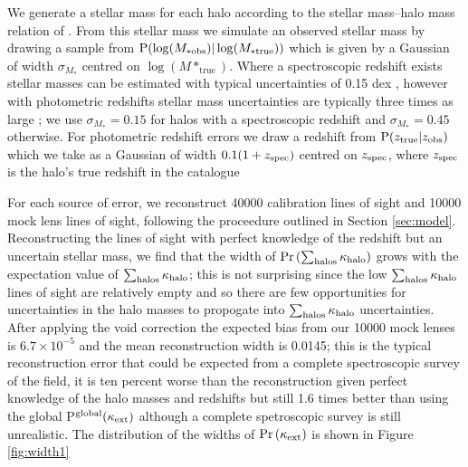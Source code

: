 \documentclass[useAMS,usenatbib]{mn2e}
\begin{document}
We generate a stellar mass for each halo according to the stellar mass--halo mass relation of \citet{behroozi2010}. From this stellar mass we simulate 
an observed stellar mass by drawing a sample from ${\rm P}(\log(M_{* \mathrm {obs}})|\log(M_{* \mathrm {true}}))$ which is given by  a Gaussian of width $\sigma_{M_*}$ centred on $\log(M*_{\mathrm {true}})$. Where a spectroscopic redshift exists stellar masses can be estimated with typical uncertainties of 0.15 dex \citep{xxx}, however with photometric redshifts stellar mass uncertainties are typically three times as large \citep{xxx}; we use $\sigma_{M_*}=0.15$ for halos with a spectroscopic redshift and $\sigma_{M_*}=0.45$ otherwise.  For photometric redshift errors we draw a redshift from ${\rm P}(z_{\rm true}|z_{\rm obs})$ which we take as a Gaussian of width $0.1(1+z_{\rm spec})$ centred on $z_{\rm spec}$, where $z_{\rm spec}$ is the halo's true redshift in the \MS catalogue

For each  source of error, we reconstruct 40000 calibration lines of sight and 10000 mock lens lines of sight, following the proceedure outlined in Section \ref{sec:model}. Reconstructing the lines of sight with perfect knowledge of the redshift but an uncertain stellar mass, we find that the width of $\Pr\left(\sum_{\rm halos} \kappa_{\rm halo} \right)$ grows with the expectation value of $\sum_{\rm halos} \kappa_{\rm halo}$; this is not surprising since the low $\sum_{\rm halos} \kappa_{\rm halo}$ lines of sight are relatively empty and so there are few opportunities for uncertainties in the halo masses to propogate into $\sum_{\rm halos} \kappa_{\rm halo}$ uncertainties. After applying the void correction the expected bias from our 10000 mock lenses is $6.7\times 10^{-5}$ and the mean reconstruction width is 0.0145; this is the typical reconstruction error that could be expected from a complete spectroscopic survey of the field, it is ten percent worse than the reconstruction given perfect knowledge of the halo masses and redshifts but still 1.6 times better than using the global P$^{\rm global}(\kappa_{\rm ext})$ although a complete spetroscopic survey is still unrealistic. The distribution of the widths of $\Pr\left(\kappa_{\rm ext} \right)$ is shown in Figure \ref{fig:width1}
\end{document}
